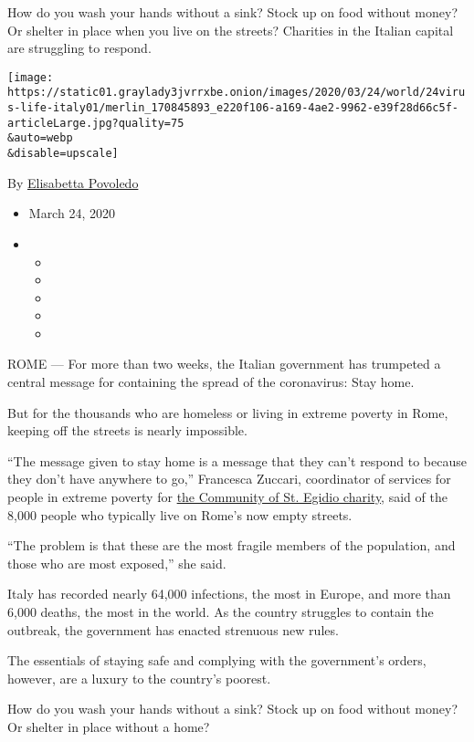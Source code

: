 How do you wash your hands without a sink? Stock up on food without
money? Or shelter in place when you live on the streets? Charities in
the Italian capital are struggling to respond.

\texttt{[image: https://static01.graylady3jvrrxbe.onion/images/2020/03/24/world/24virus-life-italy01/merlin\_170845893\_e220f106-a169-4ae2-9962-e39f28d66c5f-articleLarge.jpg?quality=75\\\&auto=webp\\\&disable=upscale]}

By
\href{https://www.nytimes3xbfgragh.onion/by/elisabetta-povoledo}{Elisabetta
Povoledo}

\begin{itemize}
\item
  March 24, 2020
\item
  \begin{itemize}
  \item
  \item
  \item
  \item
  \item
  \end{itemize}
\end{itemize}

ROME --- For more than two weeks, the Italian government has trumpeted a
central message for containing the spread of the coronavirus: Stay home.

But for the thousands who are homeless or living in extreme poverty in
Rome, keeping off the streets is nearly impossible.

``The message given to stay home is a message that they can't respond to
because they don't have anywhere to go,'' Francesca Zuccari, coordinator
of services for people in extreme poverty for
\href{https://www.santegidio.org/pageID/30008/langID/en/THE-COMMUNITY.html}{the
Community of St. Egidio charity}, said of the 8,000 people who typically
live on Rome's now empty streets.

``The problem is that these are the most fragile members of the
population, and those who are most exposed,'' she said.

Italy has recorded nearly 64,000 infections, the most in Europe, and
more than 6,000 deaths, the most in the world. As the country struggles
to contain the outbreak, the government has enacted strenuous new rules.

The essentials of staying safe and complying with the government's
orders, however, are a luxury to the country's poorest.

How do you wash your hands without a sink? Stock up on food without
money? Or shelter in place without a home?

